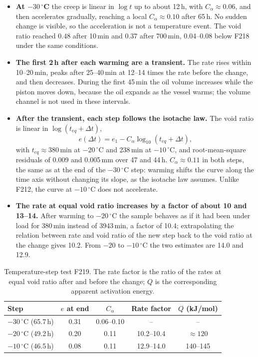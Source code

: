 \begin{itemize}
    \item \textbf{At $-30\,^\circ$C} the creep is linear in $\log t$ up to about 12\,h, with $C_\alpha\approx0.06$, and then accelerates gradually, reaching a local $C_\alpha\approx0.10$ after 65\,h. No sudden change is visible, so the acceleration is not a temperature event. The void ratio reached 0.48 after 10\,min and 0.37 after 700\,min, 0.04--0.08 below F218 under the same conditions.
    \item \textbf{The first 2\,h after each warming are a transient.} The rate rises within 10--20\,min, peaks after 25--40\,min at 12--14 times the rate before the change, and then decreases. During the first 45\,min the oil volume increases while the piston moves down, because the oil expands as the vessel warms; the volume channel is not used in these intervals.
    \item \textbf{After the transient, each step follows the isotache law.} The void ratio is linear in $\log(t_{eq}+\Delta t)$,
    \begin{equation}
        e(\Delta t) = e_1 - C_\alpha\log_{10}\!\left(t_{eq}+\Delta t\right), \label{eq:F219_fit}
    \end{equation}
    with $t_{eq}\approx380$\,min at $-20\,^\circ$C and 238\,min at $-10\,^\circ$C, and root-mean-square residuals of 0.009 and 0.005\,mm over 47 and 44\,h. $C_\alpha\approx0.11$ in both steps, the same as at the end of the $-30\,^\circ$C step: warming shifts the curve along the time axis without changing its slope, as the isotache law assumes. Unlike F212, the curve at $-10\,^\circ$C does not accelerate.
    \item \textbf{The rate at equal void ratio increases by a factor of about 10 and 13--14.} After warming to $-20\,^\circ$C the sample behaves as if it had been under load for 380\,min instead of 3943\,min, a factor of 10.4; extrapolating the relation between rate and void ratio of the new step back to the void ratio at the change gives 10.2. From $-20$ to $-10\,^\circ$C the two estimates are 14.0 and 12.9.
\end{itemize}

\begin{table}[H]
\centering
\small
\begin{tabular}{@{}lcccc@{}}
\toprule
Step & $e$ at end & $C_\alpha$ & Rate factor & $Q$ (kJ/mol) \\
\midrule
$-30\,^\circ$C (65.7\,h) & 0.31 & 0.06--0.10 & -- & -- \\
$-20\,^\circ$C (49.2\,h) & 0.20 & 0.11 & 10.2--10.4 & $\approx120$ \\
$-10\,^\circ$C (46.5\,h) & 0.08 & 0.11 & 12.9--14.0 & 140--145 \\
\bottomrule
\end{tabular}
\caption{Temperature-step test F219. The rate factor is the ratio of the rates at equal void ratio after and before the change; $Q$ is the corresponding apparent activation energy.}
\label{tab:F219}
\end{table}

